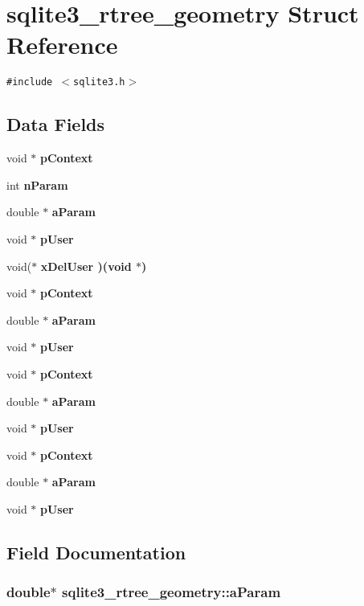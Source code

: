 \section{sqlite3\_\-rtree\_\-geometry Struct Reference}
\label{structsqlite3__rtree__geometry}
{\tt \#include $<$sqlite3.h$>$}

\subsection*{Data Fields}
\begin{CompactItemize}
\item 
void $\ast$ \bf{p\-Context}
\item 
int \bf{n\-Param}
\item 
double $\ast$ \bf{a\-Param}
\item 
void $\ast$ \bf{p\-User}
\item 
void($\ast$ \bf{x\-Del\-User} )(void $\ast$)
\item 
void $\ast$ \bf{p\-Context}
\item 
double $\ast$ \bf{a\-Param}
\item 
void $\ast$ \bf{p\-User}
\item 
void $\ast$ \bf{p\-Context}
\item 
double $\ast$ \bf{a\-Param}
\item 
void $\ast$ \bf{p\-User}
\item 
void $\ast$ \bf{p\-Context}
\item 
double $\ast$ \bf{a\-Param}
\item 
void $\ast$ \bf{p\-User}
\end{CompactItemize}


\subsection{Field Documentation}
\subsubsection{\setlength{\rightskip}{0pt plus 5cm}double$\ast$ \bf{sqlite3\_\-rtree\_\-geometry::a\-Param}}\label{structsqlite3__rtree__geometry_d41f96ddc902fd7f1069732b580d6bb6}


